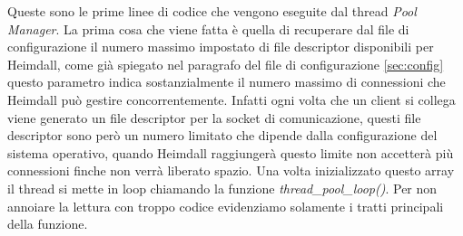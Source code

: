 \documentclass[italian]{tktltiki2}
\begin{document}
Queste sono le prime linee di codice che vengono eseguite dal thread \emph{Pool Manager}. La prima cosa che viene fatta è quella di recuperare dal file di configurazione il numero massimo impostato di file descriptor disponibili per Heimdall, come già spiegato nel paragrafo del file di configurazione \ref{sec:config} questo parametro indica sostanzialmente il numero massimo di connessioni che Heimdall può gestire concorrentemente. Infatti ogni volta che un client si collega viene generato un file descriptor per la socket di comunicazione, questi file descriptor sono però un numero limitato che dipende dalla configurazione del sistema operativo, quando Heimdall raggiungerà questo limite non accetterà più connessioni finche non verrà liberato spazio. Una volta inizializzato questo array il thread si mette in loop chiamando la funzione \emph{thread\_pool\_loop()}. Per non annoiare la lettura con troppo codice evidenziamo solamente i tratti principali della funzione.\\\\
\end{document}
